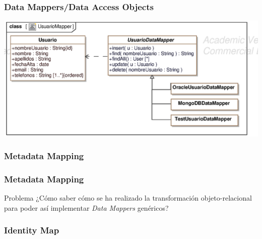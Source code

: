 \documentclass[a4paper,slidestop,xcolor=pst,dvips,blue]{beamer}
\begin{document}
\begin{frame}[c]
    \frametitle{Data Mappers/Data Access Objects}
    \begin{center}
        \includegraphics[width=0.8\linewidth]{images/persistencia/behaviour/dataMapper.eps}
    \end{center}
\end{frame}

\subsubsection{Metadata Mapping}

\begin{frame}[c]
    \frametitle{Metadata Mapping}
    \begin{block}{Problema}
        ¿Cómo saber cómo se ha realizado la transformación objeto-relacional para poder así implementar \emph{Data Mappers} genéricos?
    \end{block}
\end{frame}

\subsubsection{Identity Map}
\end{document}
